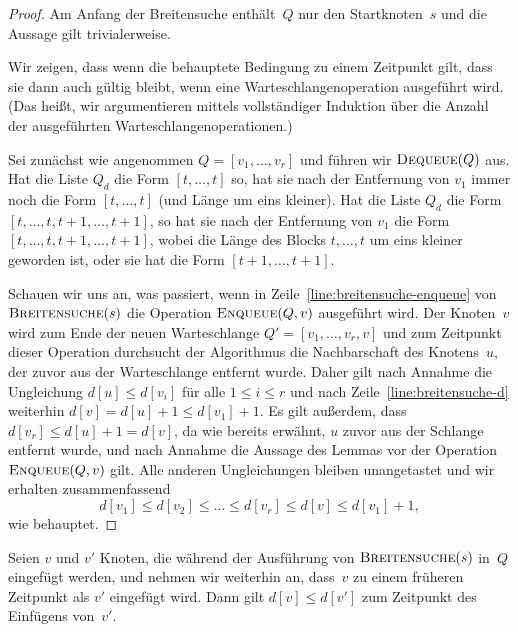 \begin{proof}
Am Anfang der Breitensuche enthält~$Q$ nur den Startknoten~$s$ und die Aussage gilt trivialerweise.

Wir zeigen, dass wenn die behauptete Bedingung zu einem Zeitpunkt gilt, dass sie dann auch gültig bleibt, wenn eine Warteschlangenoperation ausgeführt wird.
(Das heißt, wir argumentieren mittels vollständiger Induktion über die Anzahl der ausgeführten Warteschlangenoperationen.)

\condclearpage 

Sei zunächst wie angenommen $Q=[v_1,\ldots,v_r]$ und führen wir $\mathop{\text{\textsc{Dequeue}}}(Q)$ aus.
Hat die Liste $Q_d$ die Form $[t,\ldots,t]$ so, hat sie nach der Entfernung von $v_1$ immer noch die Form $[t,\ldots,t]$ (und Länge um eins kleiner).
Hat die Liste $Q_d$ die Form $[t,\ldots,t,t+1,\ldots,t+1]$, so hat sie nach der Entfernung von $v_1$ die Form $[t,\ldots,t,t+1,\ldots,t+1]$, wobei die Länge des Blocks $t,\ldots,t$ um eins kleiner geworden ist, oder sie hat die Form $[t+1,\ldots,t+1]$. 

\condclearpage 

Schauen wir uns an, was passiert, wenn in Zeile~\ref{line:breitensuche-enqueue} von $\mathop{\text{\textsc{Breitensuche}}}(s)$ die Opera\-tion $\mathop{\text{\textsc{Enqueue}}}(Q,v)$ ausgeführt wird.
Der Knoten~$v$ wird zum Ende der neuen Warteschlange $Q'=[v_1,\ldots,v_r,v]$ und zum Zeitpunkt dieser Operation durchsucht der Algorithmus die Nachbarschaft des Knotens~$u$, der zuvor aus der Warteschlange entfernt wurde.
Daher gilt nach Annahme die Ungleichung $d[u] \leq d[v_i]$ für alle $1 \leq i \leq r$ und nach Zeile~\ref{line:breitensuche-d} weiterhin $d[v] = d[u]+1 \leq d[v_1]+1$.
Es gilt außerdem, dass $d[v_r] \leq d[u]+1=d[v]$, da wie bereits erwähnt, $u$ zuvor aus der Schlange entfernt wurde, und nach Annahme die Aussage des Lemmas vor der Operation $\mathop{\text{\textsc{Enqueue}}}(Q,v)$ gilt.
Alle anderen Ungleichungen bleiben unangetastet und wir erhalten zusammenfassend
\[
d[v_1] \leq d[v_2] \leq \ldots \leq d[v_r] \leq d[v] \leq d[v_1] + 1,
\]
wie behauptet.
\end{proof}

\begin{kor}
\label{cor:breitensuche-warteschlange}
Seien $v$ und $v'$ Knoten, die während der Ausführung von $\mathop{\text{\textsc{Breitensuche}}}(s)$ in~$Q$ eingefügt werden, und nehmen wir weiterhin an, dass~$v$ zu einem früheren Zeitpunkt als $v'$ eingefügt wird.
Dann gilt $d[v] \leq d[v']$ zum Zeitpunkt des Einfügens von~$v'$.
\end{kor}

